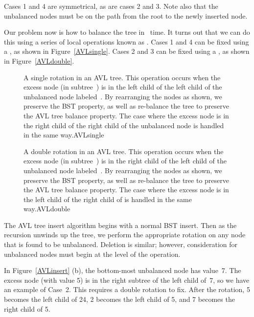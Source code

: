 \noindent Cases 1 and 4 are symmetrical, as are cases 2 and 3.
Note also that the unbalanced nodes must be on the path from
the root to the newly inserted node.

Our problem now is how to balance the tree in \Ologn\ time.
It turns out that we can do this using a series of local operations
known as .
Cases 1 and 4 can be fixed using a , as shown in
Figure~\ref{AVLsingle}.
Cases 2 and 3 can be fixed using a , as shown
in Figure~\ref{AVLdouble}.

\begin{figure}
\vspace{-\smallskipamount}
{A single rotation in an AVL tree.
This operation occurs when the excess node (in subtree~) is in
the left child of the left child of the unbalanced node
labeled~.
By rearranging the nodes as shown, we preserve the BST property, as
well as re-balance the tree to preserve the AVL tree balance
property.
The case where the excess node is in the right child of the
right child of the unbalanced node is handled in the same
way.}{AVLsingle}
\medskip
\end{figure}

\begin{figure}
\vspace{-\smallskipamount}
{A double rotation in an AVL tree.
This operation occurs when the excess node (in subtree~) is in
the right child of the left child of the unbalanced node
labeled~.
By rearranging the nodes as shown, we preserve the BST property, as
well as re-balance the tree to preserve the AVL tree balance
property.
The case where the excess node is in the left child of the
right child of  is handled in the same way.}{AVLdouble}
\bigskip
\end{figure}

The AVL tree insert algorithm begins with a normal BST insert.
Then as the recursion unwinds up the tree, we perform the appropriate
rotation on any node that is found to be unbalanced.
Deletion is similar; however, consideration for unbalanced nodes must
begin at the level of the  operation.

\begin{example}
In Figure~\ref{AVLinsert} (b), the bottom-most unbalanced node has
val\-ue~7.
The excess node (with value 5) is in the right subtree of the left
child of~7, so we have an example of Case~2.
This requires a double rotation to fix.
After the rotation, 5 becomes the left child of 24, 2 becomes the left
child of 5, and 7 becomes the right child of 5.
\end{example}

